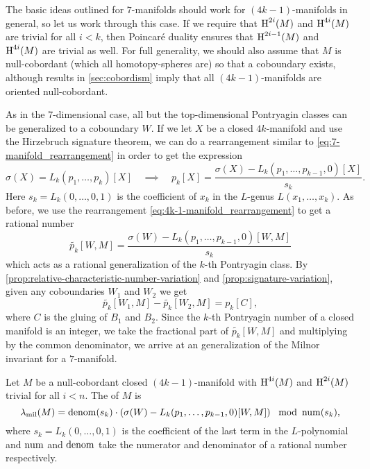 The basic ideas outlined for $7$-manifolds should work for $(4k-1)$-manifolds in general, so let us work through this case. If we require that $\operatorname{H}^{2i}(M)$ and $\operatorname{H}^{4i}(M)$ are trivial for all $i<k$, then Poincar\'e duality ensures that $\operatorname{H}^{2i-1}(M)$ and $\operatorname{H}^{4i}(M)$ are trivial as well. For full generality, we should also assume that $M$ is null-cobordant (which all homotopy-spheres are) so that a coboundary exists, although results in \cref{sec:cobordism} imply that all $(4k-1)$-manifolds are oriented null-cobordant.

As in the $7$-dimensional case, all but the top-dimensional Pontryagin classes can be generalized to a coboundary $W$.
If we let $X$ be a closed $4k$-manifold and use the Hirzebruch signature theorem, we can do a rearrangement similar to \cref{eq:7-manifold_rearrangement} in order to get the expression
\begin{equation}\label{eq:4k-1-manifold_rearrangement}
	\sigma(X) = L_k(p_1, \ldots, p_k)[X]\quad\implies\quad
	p_k[X] = \frac{\sigma(X) - L_k(p_1,\ldots, p_{k-1}, 0)[X]}{s_k}.
\end{equation}
Here $s_k=L_k(0,\ldots, 0, 1)$ is the coefficient of $x_k$ in the $L$-genus $L(x_1,\ldots, x_k)$.
As before, we use the rearrangement \cref{eq:4k-1-manifold_rearrangement} to get a rational number
\[
	\widetilde{p_k}[W, M] = \frac{\sigma(W) - L_k(p_1,\ldots, p_{k-1}, 0)[W,M]}{s_k}
\]
which acts as a rational generalization of the $k$-th Pontryagin class. By \cref{prop:relative-characteristic-number-variation} and \cref{prop:signature-variation}, given any coboundaries $W_1$ and $W_2$ we get
\[
	\widetilde{p_k}[W_1, M] - \widetilde{p_k}[W_2, M] = p_k[C],
\]
where $C$ is the gluing of $B_1$ and $B_2$. Since the $k$-th Pontryagin number of a closed manifold is an integer, we take the fractional part of $\widetilde{p_k}[W,M]$ and multiplying by the common denominator, we arrive at an generalization of the Milnor invariant for a $7$-manifold.

\begin{definition}
	Let $M$ be a null-cobordant closed $(4k-1)$-manifold with $\operatorname{H}^{4i}(M)$ and $\operatorname{H}^{2i}(M)$ trivial for all $i<n$. The  of $M$ is
	\[
		\lambda_{\mathrm{mil}}(M) = \operatorname{denom}(s_k)\cdot \left(\sigma(W) - L_k(p_1, \ldots, p_{k-1},0)[W,M]\right)\mod {\operatorname{num}}(s_k),
	\]
	where $s_k = L_k(0,\ldots,0,1)$ is the coefficient of the last term in the $L$-polynomial and $\operatorname{num}$ and $\operatorname{denom}$ take the numerator and denominator of a rational number respectively.
\end{definition}

